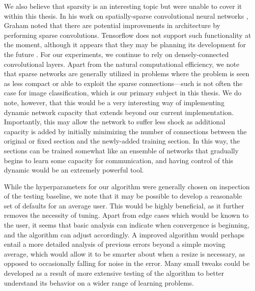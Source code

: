 We also believe that sparsity is an interesting topic but were unable to cover it within this thesis.
In his work on spatially-sparse convolutional neural networks \cite{graham2014spatially}, Graham noted that there are potential improvements in architecture by performing sparse convolutions.
Tensorflow does not support such functionality at the moment, although it appears that they may be planning its development for the future \cite{spatiallysparseconv}.
For our experiments, we continue to rely on densely-connected convolutional layers.
Apart from the natural computational efficiency, we note that sparse networks are generally utilized in problems where the problem is seen as less compact or able to exploit the sparse connections---such is not often the case for image classification, which is our primary subject in this thesis.
We do note, however, that this would be a very interesting way of implementing dynamic network capacity that extends beyond our current implementation.
Importantly, this may allow the network to suffer less shock as additional capacity is added by initially minimizing the number of connections between the original or fixed section and the newly-added training section.
In this way, the sections can be trained somewhat like an ensemble of networks that gradually begins to learn some capacity for communication, and having control of this dynamic would be an extremely powerful tool.

While the hyperparameters for our algorithm were generally chosen on inspection of the testing baseline, we note that it may be possible to develop a reasonable set of defaults for an average user.
This would be highly beneficial, as it further removes the necessity of tuning.
Apart from edge cases which would be known to the user, it seems that basic analysis can indicate when convergence is beginning, and the algorithm can adjust accordingly.
A improved algorithm would perhaps entail a more detailed analysis of previous errors beyond a simple moving average, which would allow it to be smarter about when a resize is necessary, as opposed to occasionally falling for noise in the error.
Many small tweaks could be developed as a result of more extensive testing of the algorithm to better understand its behavior on a wider range of learning problems.

